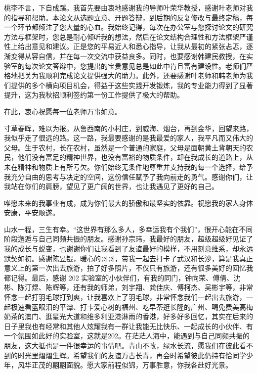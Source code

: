 \documentclass[12pt,a4paper,openright,UTF8]{ctexbook}
\begin{document}
桃李不言，下自成蹊。我首先要由衷地感谢我的导师叶荣华教授，感谢叶老师对我的指导和帮助。本论文从选题立意、开题答辩，到后期的反复修改与最终定稿，每一个环节都倾注了您大量的心血。我始终记得，每次在办公室与您探讨论文的研究方法与框架时，您总是耐心倾听我的想法，然后在论文结构合理性和方法框架严谨性上给出意见和建议。正是您的平易近人和悉心指导，让我从最初的紧张忐忑，逐渐变得从容自信，并在每一次交流中获益良多。同时，也要感谢韩建民教授，在实验室的每次论文答辩中，您提出的宝贵意见总是如此中肯且富有建设性。老师们严格地把关为我顺利完成论文提供强大的助力。此外，还要感谢叶老师和韩老师为我们提供的多个横向项目机会，得益于这些实践开发锻炼，我的专业能力得到了显著提升，这为我秋招顺利签约第一份工作提供了极大的帮助。


在此，衷心祝愿每一位老师万事如意。


寸草春晖，难以为报。从鲁西南的小村庄，到威海、烟台，再到金华，回望来路，我似乎走了很远的路。这一路，我最要感谢的是我最爱的家人，我平凡而又伟大的父母。生于农村，长在农村，虽然是一个普通的家庭，父母是面朝黄土背朝天的农民，他们没有富足的精神世界，也没有富裕的物质条件，却在我成长的道路上，从未在精神和物质上有所亏欠。你们始终无条件地尊重并支持我的每一个选择，给予我充分自由的思考与决定的空间，这份信任赋予了我向前走的勇气。感谢你们，让我站在你们的肩膀，望见了更广阔的世界，也让我遇见了更好的自己。


唯愿未来的我事业有成，成为你们最大的骄傲和最坚实的依靠。祝愿我的家人身体安康，平安顺遂。


山水一程，三生有幸。“这世界有那么多人，多幸运我有个我们”，很开心能在不同阶段邂逅与自己同频共振的朋友。感谢孙宗玮，我最好的朋友，超级超级好见证了我的成长与蜕变，也谢谢你们让我看到了友谊最好的模样，不用刻意维系，却永远默契如初。感谢陈昱锟，暖心的哥哥，带我一起去打卡了武汉和长沙，算是我真正意义上的第一次出去旅游，拍了好多照片，不仅只有旅游，还有很多美好的回忆我都记得。最后，感谢 202 实验室的小伙伴们，有我的同门，钟向荣、傅倩、沈彬、陈汀煜、陈辉等，还有我的师弟，刘宇翔、龚佳庆、傅柯杰、吴彬宇等，非常怀念一起打羽毛球打到爽，让我喜欢上了羽毛球，非常怀念我们一起出去旅游，一起极速看蓝眼泪的平潭、打卡爱心树的福州、吃早茶逛长隆的广州、喝免费美高梅奶茶的澳门、逛星光大道和维多利亚港淋雨的香港，好多好多回忆，其实在后来的日子里我也有经常和其他人炫耀我有一群让我能无比快乐、一起成长的小伙伴、有一个氛围如此好的实验室，这就是202。在茫茫人海中，能遇到与自己同频共振的朋友，这大抵也是一件很幸运的事情吧。青山不改，绿水长流，愿我们在彼此看不到的时光里熠熠生辉。希望我们的友谊万古长青，再会时希望彼此仍持有恰同学少年，风华正茂的翩翩面貌。愿大家前程似锦，万事胜意，你我各赴好光景。
\end{document}
